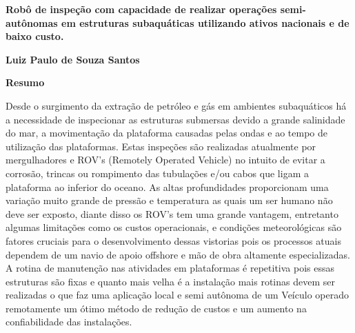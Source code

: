 \newpage
\thispagestyle{empty}
\begin{center}
  \textbf{\Large Robô de inspeção com capacidade de realizar operações semi-autônomas em estruturas subaquáticas utilizando ativos nacionais e de baixo custo.
  }

  \vspace*{1cm}
  \textbf{\large Luiz Paulo de Souza Santos}

  \vspace*{2cm}

  \textbf{\large Resumo}
\end{center}



Desde o surgimento da extração de petróleo e gás em ambientes subaquáticos há a necessidade de inspecionar as estruturas submersas devido a grande salinidade do mar, a movimentação da plataforma causadas pelas ondas e ao tempo de utilização das plataformas. Estas inspeções são realizadas atualmente por mergulhadores e ROV's  (Remotely Operated Vehicle) no intuito de evitar a corrosão, trincas ou rompimento das tubulações e/ou cabos que ligam a plataforma ao inferior do oceano. As altas profundidades proporcionam uma variação muito grande de pressão e temperatura as quais um ser humano não deve ser exposto, diante disso os ROV's tem uma grande vantagem, entretanto algumas limitações como os custos operacionais, e condições meteorológicas são fatores cruciais para o desenvolvimento dessas vistorias pois os processos atuais dependem de um navio de apoio offshore e mão de obra altamente especializadas.
A rotina de manutenção nas atividades em plataformas é repetitiva pois essas estruturas são fixas e quanto mais velha é a instalação mais rotinas devem ser realizadas o que faz uma aplicação local e semi autônoma de um Veículo operado remotamente um ótimo método de redução de custos e um aumento na confiabilidade das instalações.

